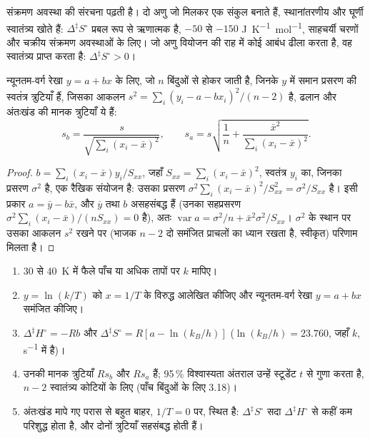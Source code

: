  संक्रमण अवस्था की संरचना पढ़ती है। दो
अणु जो मिलकर एक संकुल बनाते हैं, स्थानांतरणीय और घूर्णी
स्वातंत्र्य खोते हैं: $\Delta^{\ddagger}S^\circ$ प्रबल रूप से ऋणात्मक है, $-50$ से $-150$ \unit{J.K^{-1}.mol^{-1}},
साहचर्यी चरणों और चक्रीय संक्रमण अवस्थाओं के लिए। जो अणु वियोजन की राह में कोई आबंध
ढीला करता है, वह स्वातंत्र्य प्राप्त करता है: $\Delta^{\ddagger}S^\circ > 0$।

\begin{proposition}[समंजित रेखा की मानक त्रुटियाँ]\label{prop:b3:rate-theories:slope-uncertainty}
न्यूनतम-वर्ग रेखा $y = a + bx$ के लिए, जो $n$ बिंदुओं से होकर जाती है, जिनके $y$ में
समान प्रसरण की स्वतंत्र त्रुटियाँ हैं, जिसका आकलन $s^2 = \sum_i(y_i - a - bx_i)^2/(n - 2)$ है,
ढलान और अंतःखंड की मानक त्रुटियाँ ये हैं:
\[
  s_b = \frac{s}{\sqrt{\sum_i(x_i - \bar x)^2}}, \qquad
  s_a = s\sqrt{\frac1n + \frac{\bar x^2}{\sum_i(x_i - \bar x)^2}} .
\]
\end{proposition}

\begin{proof}
$b = \sum_i(x_i - \bar x)y_i/S_{xx}$, जहाँ $S_{xx} = \sum_i(x_i - \bar x)^2$, स्वतंत्र $y_i$ का, जिनका
प्रसरण $\sigma^2$ है, एक रैखिक संयोजन है: उसका प्रसरण $\sigma^2\sum_i(x_i - \bar x)^2/S_{xx}^2 = \sigma^2/S_{xx}$ है।
इसी प्रकार $a = \bar y - b\bar x$, और $\bar y$ तथा $b$ असहसंबद्ध हैं (उनका सहप्रसरण
$\sigma^2\sum_i(x_i - \bar x)/(nS_{xx}) = 0$ है), अतः $\operatorname{var}a = \sigma^2/n + \bar x^2\sigma^2/S_{xx}$। $\sigma^2$ के स्थान पर
उसका आकलन $s^2$ रखने पर (भाजक $n - 2$ दो समंजित
प्राचलों का ध्यान रखता है, स्वीकृत) परिणाम मिलता है।
\end{proof}

\begin{method}[अनिश्चितताओं सहित आयरिंग आलेख]\label{met:b3:rate-theories:eyring-plot}
\begin{enumerate}
  \item 30 से \qty{40}{K} में फैले पाँच या अधिक तापों पर $k$ मापिए।
  \item $y = \ln(k/T)$ को $x = 1/T$ के विरुद्ध आलेखित कीजिए और न्यूनतम-वर्ग रेखा $y = a + bx$ समंजित कीजिए।
  \item $\Delta^{\ddagger}H^\circ = -Rb$ और $\Delta^{\ddagger}S^\circ = R[a - \ln(k_B/h)]$ ($\ln(k_B/h) = 23.760$, जहाँ $k$,
        \unit{s^{-1}} में है)।
  \item उनकी मानक त्रुटियाँ $Rs_b$ और $Rs_a$ हैं; 95\,\% विश्वास्यता अंतराल
        उन्हें स्टूडेंट $t$ से गुणा करता है, $n - 2$ स्वातंत्र्य कोटियों के लिए (पाँच बिंदुओं के लिए
        3.18)।
  \item अंतःखंड मापे गए परास से बहुत बाहर, $1/T = 0$ पर, स्थित है: $\Delta^{\ddagger}S^\circ$
        सदा $\Delta^{\ddagger}H^\circ$ से कहीं कम परिशुद्ध होता है, और दोनों त्रुटियाँ
        सहसंबद्ध होती हैं।
\end{enumerate}
\end{method}

